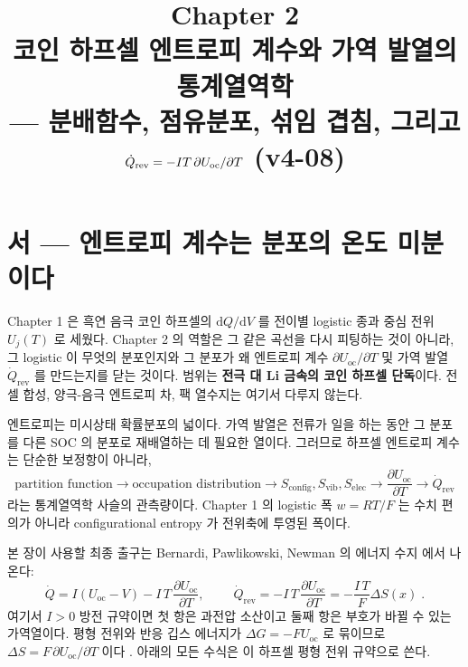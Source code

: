 \documentclass[11pt,a4paper]{article}
\title{\textbf{\LARGE Chapter 2}\\[0.35em]\Large 코인 하프셀 엔트로피 계수와 가역 발열의 통계열역학\\[0.2em]\large — 분배함수, 점유분포, 섞임 겹침, 그리고 $\dot Q_\rev=-IT\,\partial U_\oc/\partial T$ (v4-08)}
\author{}\date{}
\newcommand{\dd}{\mathrm{d}}
\newcommand{\rev}{\mathrm{rev}}
\newcommand{\oc}{\mathrm{oc}}
\newcommand{\config}{\mathrm{config}}
\newcommand{\vib}{\mathrm{vib}}
\newcommand{\elec}{\mathrm{elec}}
\begin{document}
\maketitle

\section*{서 — 엔트로피 계수는 분포의 온도 미분이다}
Chapter 1 은 흑연 음극 코인 하프셀의 $\dd Q/\dd V$ 를 전이별 logistic 종과 중심 전위
$U_j(T)$ 로 세웠다. Chapter 2 의 역할은 그 같은 곡선을 다시 피팅하는 것이 아니라, 그 logistic 이
무엇의 분포인지와 그 분포가 왜 엔트로피 계수 $\partial U_\oc/\partial T$ 및 가역 발열
$\dot Q_\rev$ 를 만드는지를 닫는 것이다. 범위는 \textbf{전극 대 Li 금속의 코인 하프셀 단독}이다.
전셀 합성, 양극-음극 엔트로피 차, 팩 열수지는 여기서 다루지 않는다.

엔트로피는 미시상태 확률분포의 넓이다. 가역 발열은 전류가 일을 하는 동안 그 분포를 다른 SOC 의
분포로 재배열하는 데 필요한 열이다. 그러므로 하프셀 엔트로피 계수는 단순한 보정항이 아니라,
\[
\boxed{\;\text{partition function}\to\text{occupation distribution}\to
S_{\config},S_{\vib},S_{\elec}\to\frac{\partial U_\oc}{\partial T}\to\dot Q_\rev\;}
\]
라는 통계열역학 사슬의 관측량이다. Chapter 1 의 logistic 폭 $w=RT/F$ 는 수치 편의가 아니라
configurational entropy 가 전위축에 투영된 폭이다.

본 장이 사용할 최종 출구는 Bernardi, Pawlikowski, Newman 의 에너지 수지 \cite{bernardi1985} 에서 나온다:
\begin{equation}
\dot Q = I(U_\oc-V)-I\,T\,\frac{\partial U_\oc}{\partial T},\qquad
\boxed{\;\dot Q_\rev=-I\,T\,\frac{\partial U_\oc}{\partial T}=-\frac{I\,T}{F}\Delta S(x)\;}.
\label{eq:bernardi_v4}
\end{equation}
여기서 $I>0$ 방전 규약이면 첫 항은 과전압 소산이고 둘째 항은 부호가 바뀔 수 있는 가역열이다.
평형 전위와 반응 깁스 에너지가 $\Delta G=-F U_\oc$ 로 묶이므로
$\Delta S=F\,\partial U_\oc/\partial T$ 이다 \cite{newman,msmr_partI}. 아래의 모든 수식은 이 하프셀
평형 전위 규약으로 쓴다.

\end{document}
